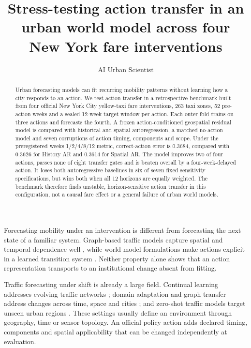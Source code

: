 \documentclass{nature}
\begin{document}
\title{Stress-testing action transfer in an urban world model across four New York fare interventions}
\author{AI Urban Scientist}
\maketitle

\begin{abstract}
Urban forecasting models can fit recurring mobility patterns without learning how a city responds to an action. We test action transfer in a retrospective benchmark built from four official New York City yellow-taxi fare interventions, 263 taxi zones, 52 pre-action weeks and a sealed 12-week target window per action. Each outer fold trains on three actions and forecasts the fourth. A frozen action-conditioned geospatial residual model is compared with historical and spatial autoregression, a matched no-action model and seven corruptions of action timing, components and scope. Under the preregistered weeks 1/2/4/8/12 metric, correct-action error is 0.3684, compared with 0.3626 for History AR and 0.3614 for Spatial AR. The model improves two of four actions, passes none of eight transfer gates and is beaten overall by a four-week-delayed action. It loses both autoregressive baselines in six of seven fixed sensitivity specifications, but wins both when all 12 horizons are equally weighted. The benchmark therefore finds unstable, horizon-sensitive action transfer in this configuration, not a causal fare effect or a general failure of urban world models.
\end{abstract}

Forecasting mobility under an intervention is different from forecasting the next state of a familiar system. Graph-based traffic models capture spatial and temporal dependence well \cite{li2018dcrnn,yu2018stgcn,wu2019graphwavenet}, while world-model formulations make actions explicit in a learned transition system \cite{ha2018worldmodels}. Neither property alone shows that an action representation transports to an institutional change absent from fitting.

Traffic forecasting under shift is already a large field. Continual learning addresses evolving traffic networks \cite{chen2021trafficstream}; domain adaptation and graph transfer address changes across time, space and cities \cite{lu2021transfer,jin2023transgtr,deng2024domain}; and zero-shot traffic models target unseen urban regions \cite{li2025opencity}. These settings usually define an environment through geography, time or sensor topology. An official policy action adds declared timing, components and spatial applicability that can be changed independently at evaluation.
\end{document}
